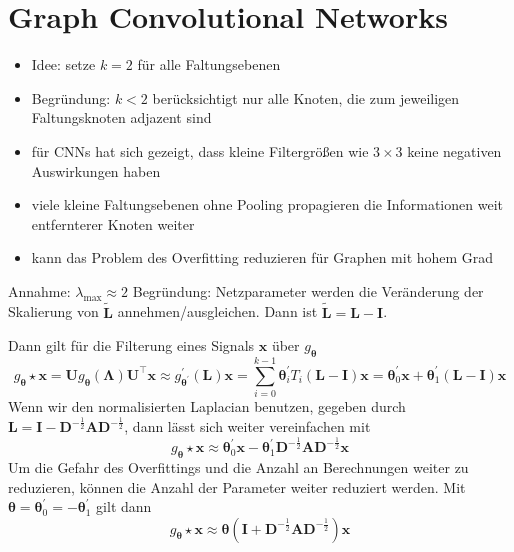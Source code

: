 \section{Graph Convolutional Networks}

\begin{itemize}
  \item Idee: setze $k = 2$ für alle Faltungsebenen
  \item Begründung: $k < 2$ berücksichtigt nur alle Knoten, die zum jeweiligen Faltungsknoten adjazent sind
  \item für CNNs hat sich gezeigt, dass kleine Filtergrößen wie $3 \times 3$ keine negativen Auswirkungen haben
  \item viele kleine Faltungsebenen ohne Pooling propagieren die Informationen weit entfernterer Knoten weiter 
  \item kann das Problem des Overfitting reduzieren für Graphen mit hohem Grad
\end{itemize}

Annahme: $\lambda_{\max} \approx 2$ 
Begründung: Netzparameter werden die Veränderung der Skalierung von $\mathbf{\tilde L}$ annehmen/ausgleichen.
Dann ist $\mathbf{\tilde L} = \mathbf{L} - \mathbf{I}$.

Dann gilt für die Filterung eines Signals $\mathbf{x}$ über $g_{\mathbf{\theta}}$
\begin{equation}
  g_{\mathbf{\theta}} \star \mathbf{x} = \mathbf{U}g_{\mathbf{\theta}}\left(\mathbf{\Lambda}\right)\mathbf{U}^{\top}\mathbf{x} \approx g^{\prime}_{\mathbf{\theta^{\prime}}} \left(\mathbf{L}\right) \mathbf{x} = \sum_{i=0}^{k-1} \mathbf{\theta}^{\prime}_i T_i \left(\mathbf{L} - \mathbf{I}\right) \mathbf{x} = \mathbf{\theta}^{\prime}_0 \mathbf{x} + \mathbf{\theta}^{\prime}_1 \left(\mathbf{L} - \mathbf{I}\right) \mathbf{x}
\end{equation}
Wenn wir den normalisierten Laplacian benutzen, gegeben durch $\mathbf{L} = \mathbf{I} - \mathbf{D}^{-\frac{1}{2}} \mathbf{A} \mathbf{D}^{-\frac{1}{2}}$, dann lässt sich weiter vereinfachen mit
\begin{equation}
  g_{\mathbf{\theta}} \star \mathbf{x} \approx \mathbf{\theta}^{\prime}_0 \mathbf{x} - \mathbf{\theta}^{\prime}_1 \mathbf{D}^{-\frac{1}{2}} \mathbf{A} \mathbf{D}^{-\frac{1}{2}} \mathbf{x}
\end{equation}
Um die Gefahr des Overfittings und die Anzahl an Berechnungen weiter zu reduzieren, können die Anzahl der Parameter weiter reduziert werden.
Mit $\mathbf{\theta} = \mathbf{\theta}^{\prime}_0 = - \mathbf{\theta}^{\prime}_1$ gilt dann
\begin{equation}
  g_{\mathbf{\theta}} \star \mathbf{x} \approx \mathbf{\theta} \left(\mathbf{I} + \mathbf{D}^{-\frac{1}{2}} \mathbf{A} \mathbf{D}^{-\frac{1}{2}}\right) \mathbf{x}
\end{equation}

